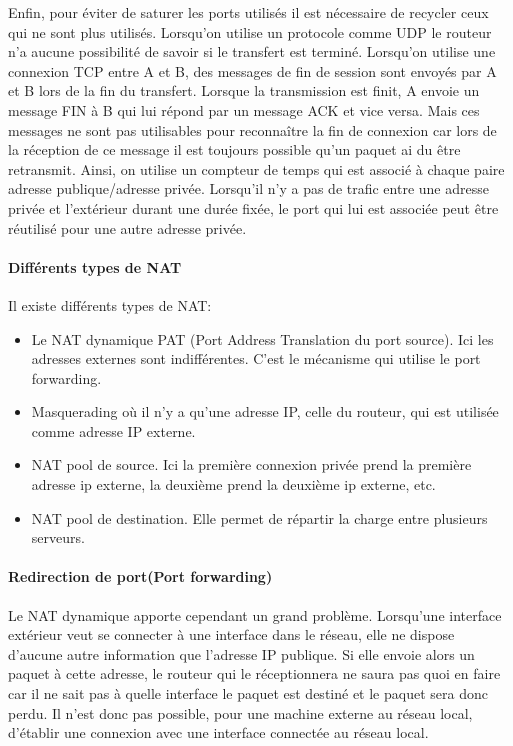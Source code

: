 Enfin, pour éviter de saturer les ports utilisés il est nécessaire de recycler
 ceux qui ne sont plus utilisés. Lorsqu'on utilise un protocole comme UDP le
routeur n'a aucune possibilité de savoir si le transfert est terminé. Lorsqu'on
utilise une connexion TCP entre A et B, des messages de fin de session sont
envoyés par A et B lors de la fin du transfert. Lorsque la transmission est
finit, A envoie un message FIN à B qui lui répond par un message ACK et vice
versa. Mais ces messages ne sont pas utilisables pour reconnaître la fin de
connexion car lors de la réception de ce message il est toujours possible qu'un
paquet ai du être retransmit. Ainsi, on utilise un compteur de temps qui est
associé à chaque paire adresse publique/adresse privée. Lorsqu'il n'y a pas de
trafic entre une adresse privée et l'extérieur durant une durée fixée, le port
qui lui est associée peut être réutilisé pour une autre adresse privée.

\paragraph{Différents types de NAT}

Il existe différents types de NAT:
\begin{itemize}
\item Le NAT dynamique PAT (Port Address Translation du port source). Ici les
adresses externes sont indifférentes. C'est le mécanisme qui utilise le port forwarding.
\item Masquerading où il n'y a qu'une adresse IP, celle du routeur, qui est
utilisée comme adresse IP externe.
\item NAT pool de source. Ici la première connexion privée prend la première
adresse ip externe, la deuxième prend la deuxième ip externe, etc.
\item NAT pool de destination. Elle permet de répartir la charge entre plusieurs
serveurs.
\end{itemize}


\paragraph{Redirection de port(Port forwarding)}

Le NAT dynamique apporte cependant un grand problème. Lorsqu'une interface
extérieur veut se connecter à une interface dans le réseau, elle ne dispose
d'aucune autre information que l'adresse IP publique. Si elle envoie alors un
paquet à cette adresse, le routeur qui le réceptionnera ne saura pas quoi en
faire car il ne sait pas à quelle interface le paquet est destiné et le paquet sera
donc perdu. Il n'est donc pas possible, pour une machine externe au réseau local, d'établir 
une connexion avec une interface connectée au réseau local.

